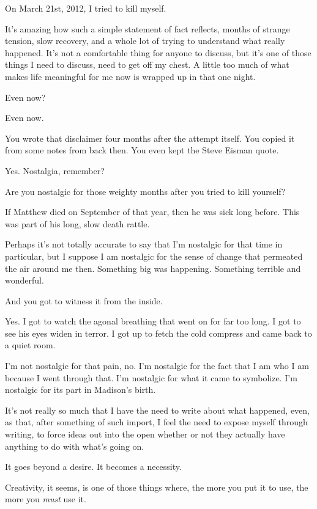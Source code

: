 On March 21st, 2012, I tried to kill myself.

It's amazing how such a simple statement of fact reflects, months of strange tension, slow recovery, and a whole lot of trying to understand what really happened. It's not a comfortable thing for anyone to discuss, but it's one of those things I need to discuss, need to get off my chest. A little too much of what makes life meaningful for me now is wrapped up in that one night.

\begin{ally}
Even now?
\end{ally}
Even now.

\begin{ally}
You wrote that disclaimer four months after the attempt itself. You copied it from some notes from back then. You even kept the Steve Eisman quote.
\end{ally}
Yes. Nostalgia, remember?

\begin{ally}
Are you nostalgic for those weighty months after you tried to kill yourself?
\end{ally}
If Matthew died on September of that year, then he was sick long before. This was part of his long, slow death rattle.

Perhaps it's not totally accurate to say that I'm nostalgic for that time in particular, but I suppose I am nostalgic for the sense of change that permeated the air around me then. Something big was happening. Something terrible and wonderful.

\begin{ally}
And you got to witness it from the inside.
\end{ally}
Yes. I got to watch the agonal breathing that went on for far too long. I got to see his eyes widen in terror. I got up to fetch the cold compress and came back to a quiet room.

I'm not nostalgic for that pain, no. I'm nostalgic for the fact that I am who I am because I went through that. I'm nostalgic for what it came to symbolize. I'm nostalgic for its part in Madison's birth.
\newpage

It's not really so much that I have the need to write about what happened, even, as that, after something of such import, I feel the need to expose myself through writing, to force ideas out into the open whether or not they actually have anything to do with what's going on.

\begin{ally}
It goes beyond a desire. It becomes a necessity.
\end{ally}
Creativity, it seems, is one of those things where, the more you put it to use, the more you \emph{must} use it.

